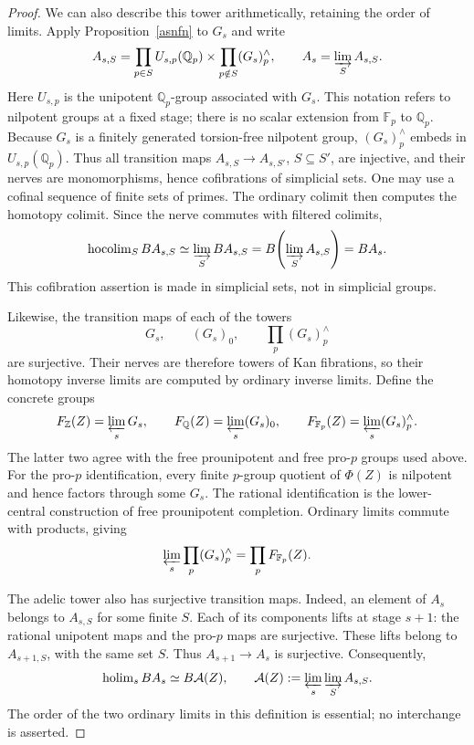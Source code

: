 \documentclass[11pt,a4paper]{article}
\begin{document}
\begin{proof}
We can also describe this tower arithmetically, retaining the order of
limits.  Apply Proposition~\ref{asnfn} to $G_s$ and write
\[
 A_{s,S}=\prod_{p\in S}U_{s,p}(\mathbb Q_p)
          \times\prod_{p\notin S}(G_s)_p^{\wedge},\qquad
 A_s=\varinjlim_S A_{s,S}.
\]
Here $U_{s,p}$ is the unipotent $\mathbb Q_p$-group associated with
$G_s$.  This notation refers to nilpotent groups at a fixed stage;
there is no scalar extension from $\mathbb F_p$ to $\mathbb Q_p$.
Because $G_s$ is a finitely generated torsion-free nilpotent group,
$(G_s)_p^{\wedge}$ embeds in $U_{s,p}(\mathbb Q_p)$.  Thus all transition
maps $A_{s,S}\to A_{s,S'}$, $S\subseteq S'$, are injective, and their
nerves are monomorphisms, hence cofibrations of simplicial sets.
One may use a cofinal sequence of finite sets of primes.  The ordinary
colimit then computes the homotopy colimit.  Since the nerve commutes
with filtered colimits,
\[
 \operatorname{hocolim}_S BA_{s,S}\simeq
 \varinjlim_S BA_{s,S}=B\!\left(\varinjlim_S A_{s,S}\right)=BA_s.
\]
This cofibration assertion is made in simplicial sets, not in simplicial
groups.

Likewise, the transition maps of each of the towers
\[
 G_s,\qquad (G_s)_0,\qquad \prod_p(G_s)_p^{\wedge}
\]
are surjective.  Their nerves are therefore towers of Kan fibrations,
so their homotopy inverse limits are computed by ordinary inverse
limits.  Define the concrete groups
\[
 F_{\mathbb Z}(Z)=\varprojlim_sG_s,\qquad
 F_{\mathbb Q}(Z)=\varprojlim_s(G_s)_0,\qquad
 F_{\mathbb F_p}(Z)=\varprojlim_s(G_s)_p^{\wedge}.
\]
The latter two agree with the free prounipotent and free pro-$p$ groups
used above.  For the pro-$p$ identification, every finite $p$-group
quotient of $\Phi(Z)$ is nilpotent and hence factors through some $G_s$.
The rational identification is the lower-central construction of free
prounipotent completion.  Ordinary limits commute with products, giving
\[
 \varprojlim_s\prod_p(G_s)_p^{\wedge}
 =\prod_pF_{\mathbb F_p}(Z).
\]

The adelic tower also has surjective transition maps.  Indeed, an
 element of $A_s$ belongs to $A_{s,S}$ for some finite $S$.  Each of its
 components lifts at stage $s+1$: the rational unipotent maps and the
 pro-$p$ maps are surjective.  These lifts belong to $A_{s+1,S}$, with
 the same set $S$.  Thus $A_{s+1}\to A_s$ is surjective.  Consequently,
\[
 \operatorname{holim}_s BA_s\simeq B\mathcal A(Z),\qquad
 \mathcal A(Z):=\varprojlim_s\varinjlim_S A_{s,S}.
\]
The order of the two ordinary limits in this definition is essential;
no interchange is asserted.


\end{proof}
\end{document}
